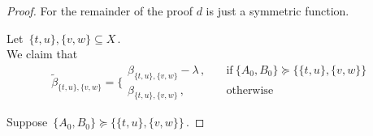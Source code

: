 \documentclass[./main.tex]{subfiles}
\begin{document}
\begin{proof}
    \hrulefill \clearpage

    For the remainder of the proof $d$ is just a symmetric function. \bigskip \bigskip

    Let $\, \{t,u\},\{v,w\} \subseteq X \,$. \\[5pt]
    We claim that
    \[ \widetilde{\beta}_{\{t,u\},\{v,w\}} = \bigg\{
        \begin{array}{cl}
            \beta_{\{t,u\},\{v,w\}} - \lambda \,,   & \quad \text{if}\ \{A_0,B_0\} \succcurlyeq \bigl\{ \{t,u\},\{v,w\} \bigr\} \\[2pt]
            \beta_{\{t,u\},\{v,w\}} \,,             & \quad \text{otherwise}
        \end{array}
    \] \bigskip

    Suppose $\, \{A_0,B_0\} \succcurlyeq \bigl\{ \{t,u\},\{v,w\} \bigr\} \,$.
    

\end{proof}
\end{document}
